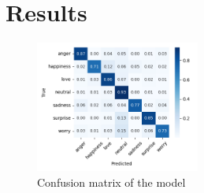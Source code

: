 \section{Results}
\label{sec:results}
\begin{figure}[H]
    \centering
    \includegraphics[width=0.48\textwidth]{images/confusion_matrix.png}
    \caption{Confusion matrix of the model}
    \label{fig:confusion_matrix}
\end{figure}
\cite{emotionRecognitionFromText}